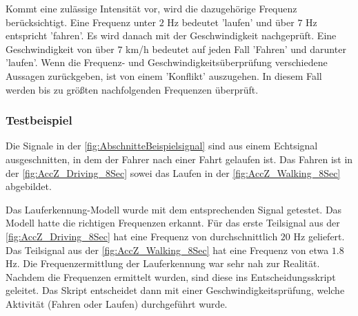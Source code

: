 Kommt eine zulässige Intensität vor, wird die dazugehörige Frequenz berücksichtigt. Eine Frequenz unter $2$ Hz bedeutet 'laufen' und über $7$ Hz entspricht 'fahren'. Es wird danach mit der Geschwindigkeit nachgeprüft. Eine Geschwindigkeit von über $7$ km/h bedeutet auf jeden Fall 'Fahren' und darunter 'laufen'.
Wenn die Frequenz- und Geschwindigkeitsüberprüfung verschiedene Aussagen zurückgeben, ist von einem 'Konflikt' auszugehen. In diesem Fall werden bis zu größten nachfolgenden Frequenzen überprüft.


\subsubsection{Testbeispiel}
Die Signale in der \autoref{fig:AbschnitteBeispielsignal} sind aus einem Echtsignal ausgeschnitten, in dem der Fahrer nach einer Fahrt gelaufen ist. Das Fahren ist in der \autoref{fig:AccZ_Driving_8Sec} sowei das Laufen in der \autoref{fig:AccZ_Walking_8Sec} abgebildet.

Das Lauferkennung-Modell wurde mit dem entsprechenden Signal getestet. Das Modell hatte die richtigen Frequenzen erkannt.
Für das erste Teilsignal aus der \autoref{fig:AccZ_Driving_8Sec} hat eine Frequenz von durchschnittlich $20$ Hz geliefert. Das Teilsignal aus der \autoref{fig:AccZ_Walking_8Sec} hat eine Frequenz von etwa $1.8$ Hz. Die Frequenzermittlung der Lauferkennung war sehr nah zur Realität.
Nachdem die Frequenzen ermittelt wurden, sind diese ins Entscheidungsskript geleitet. Das Skript entscheidet dann mit einer Geschwindigkeitsprüfung, welche Aktivität (Fahren oder Laufen) durchgeführt wurde.


